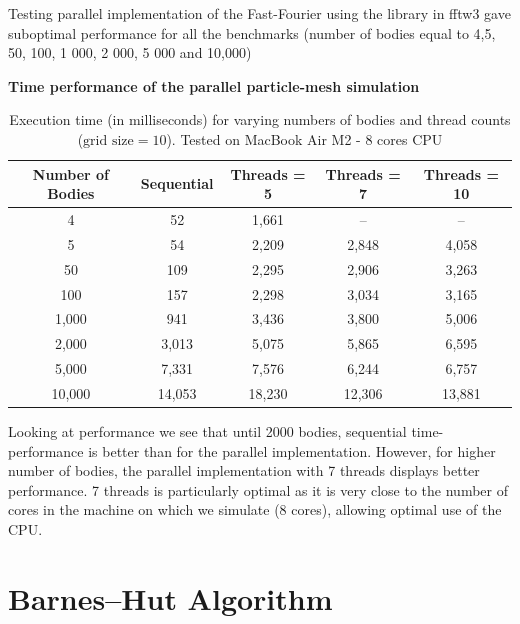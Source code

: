 \documentclass{article}
\begin{document}
Testing parallel implementation  of the Fast-Fourier using the library in fftw3 gave suboptimal performance for all the benchmarks (number of bodies equal to 4,5, 50, 100, 1 000, 2 000, 5 000 and 10,000)

\textbf{Time performance of the parallel particle-mesh simulation}
\begin{table}[htbp]
\centering
\begin{tabular}{|c|c|c|c|c|}
\hline
\textbf{Number of Bodies} & \textbf{Sequential} & \textbf{Threads = 5} & \textbf{Threads = 7} & \textbf{Threads = 10} \\
\hline
4      & 52    & 1,661  & --    & --     \\
5      & 54    & 2,209  & 2,848  & 4,058   \\
50     & 109   & 2,295  & 2,906  & 3,263   \\
100    & 157   & 2,298  & 3,034  & 3,165   \\
1,000  & 941   & 3,436  & 3,800  & 5,006   \\
2,000  & 3,013  & 5,075  & 5,865  & 6,595   \\
5,000  & 7,331  & 7,576  & 6,244  & 6,757   \\
10,000 & 14,053  & 18,230 & 12,306 & 13,881  \\
\hline
\end{tabular}
\caption{Execution time (in milliseconds) for varying numbers of bodies and thread counts ($\text{grid size} = 10$). Tested on MacBook Air M2 - 8 cores CPU}
\label{tab:thread_performance}
\end{table}

Looking at performance we see that until 2000 bodies, sequential time-performance is better than for the parallel implementation. However, for higher number of bodies, the parallel implementation with 7 threads displays better performance. 7 threads is particularly optimal as it is very close to the number of cores in the machine on which we simulate (8 cores), allowing optimal use of the CPU.  



\section{Barnes–Hut Algorithm}
\end{document}
